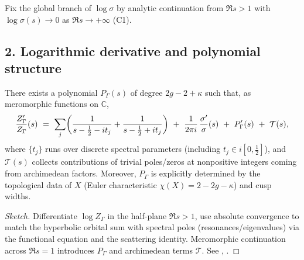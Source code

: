 \begin{remark}\relax\hspace{0pt}
\label{rem:tfc6-branch} %
Fix the global branch of $\log\sigma$ by analytic continuation from $\Re s>1$ with $\log\sigma(s)\to 0$ as $\Re s\to+\infty$ (C1). \relax\hspace{0pt}
\end{remark}

\subsection*{2. Logarithmic derivative and polynomial structure}\relax\hspace{0pt}
\label{subsec:tfc6-Zprime} %

\begin{theorem}\relax\hspace{0pt}
\label{thm:tfc6-Zprime-expansion} %
There exists a polynomial $P_\Gamma(s)$ of degree $2g-2+\kappa$ such that, as meromorphic functions on $\mathbb{C}$,
\begin{equation}\relax\hspace{0pt}
\label{eq:tfc6-Zprime}\relax\hspace{0pt}
\frac{Z_\Gamma'}{Z_\Gamma}(s)\ =\ \sum_j\!\left(\frac{1}{s-\tfrac12-it_j}+\frac{1}{s-\tfrac12+it_j}\right)\ +\ \frac{1}{2\pi i}\,\frac{\sigma'}{\sigma}(s)\ +\ P_\Gamma'(s)\ +\ \mathcal{T}(s),
\end{equation}
where $\{t_j\}$ runs over discrete spectral parameters (including $t_j\in i[0,\tfrac12]$), and $\mathcal{T}(s)$ collects contributions of trivial poles/zeros at nonpositive integers coming from archimedean factors. \relax\hspace{0pt}
Moreover, $P_\Gamma$ is explicitly determined by the topological data of $X$ (Euler characteristic $\chi(X)=2-2g-\kappa$) and cusp widths. \relax\hspace{0pt}
\end{theorem}

\begin{proof}[Sketch]\relax\hspace{0pt}
Differentiate $\log Z_\Gamma$ in the half-plane $\Re s>1$, use absolute convergence to match the hyperbolic orbital sum with spectral poles (resonances/eigenvalues) via the functional equation and the scattering identity. Meromorphic continuation across $\Re s=1$ introduces $P_\Gamma$ and archimedean terms $\mathcal{T}$. See \cite[Ch.~11--12]{HejhalII}, \cite{SelbergCollected}. \relax\hspace{0pt}
\end{proof}

